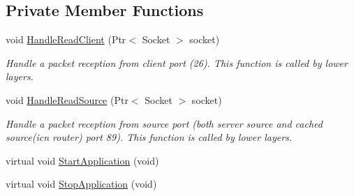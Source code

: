 \subsection*{Private Member Functions}
\begin{DoxyCompactItemize}
\item 
void \hyperlink{classns3_1_1IcnManager_a34f69ccb754cb9d10f1020d1058e49fa}{Handle\-Read\-Client} (Ptr$<$ Socket $>$ socket)
\begin{DoxyCompactList}\small\item\em Handle a packet reception from client port (26). This function is called by lower layers. \end{DoxyCompactList}\item 
void \hyperlink{classns3_1_1IcnManager_aa22b16c46e5f98443973564a875a6f58}{Handle\-Read\-Source} (Ptr$<$ Socket $>$ socket)
\begin{DoxyCompactList}\small\item\em Handle a packet reception from source port (both server source and cached source(icn router) port 89). This function is called by lower layers. \end{DoxyCompactList}\item 
virtual void \hyperlink{classns3_1_1IcnManager_ab65232c50cfdee86da1edbe3bb92c644}{Start\-Application} (void)
\item 
virtual void \hyperlink{classns3_1_1IcnManager_a609f7f582c1ffe00d45fd1ce3dbf27f2}{Stop\-Application} (void)
\end{DoxyCompactItemize}
